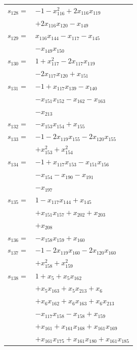 \begin{longtable}{@{}r@{\;}l@{}}
\(s_{128}=\) & \(\displaystyle -1 -x_{116}^{2} +2x_{116}x_{119}\) \\
 & \(\displaystyle +2x_{116}x_{120} -x_{149}\) \\[3pt]
\(s_{129}=\) & \(\displaystyle x_{116}x_{144} -x_{117} -x_{145}\) \\
 & \(\displaystyle -x_{149}x_{150}\) \\[3pt]
\(s_{130}=\) & \(\displaystyle 1 +x_{117}^{2} -2x_{117}x_{119}\) \\
 & \(\displaystyle -2x_{117}x_{120} +x_{151}\) \\[3pt]
\(s_{131}=\) & \(\displaystyle -1 +x_{117}x_{139} -x_{140}\) \\
 & \(\displaystyle -x_{151}x_{152} -x_{162} -x_{163}\) \\
 & \(\displaystyle -x_{213}\) \\[3pt]
\(s_{132}=\) & \(\displaystyle -x_{153}x_{154} +x_{155}\) \\[3pt]
\(s_{133}=\) & \(\displaystyle -1 -2x_{119}x_{155} -2x_{120}x_{155}\) \\
 & \(\displaystyle +x_{153}^{2} +x_{154}^{2}\) \\[3pt]
\(s_{134}=\) & \(\displaystyle -1 +x_{117}x_{153} -x_{151}x_{156}\) \\
 & \(\displaystyle -x_{154} -x_{190} -x_{191}\) \\
 & \(\displaystyle -x_{197}\) \\[3pt]
\(s_{135}=\) & \(\displaystyle 1 -x_{117}x_{144} +x_{145}\) \\
 & \(\displaystyle +x_{151}x_{157} +x_{202} +x_{203}\) \\
 & \(\displaystyle +x_{208}\) \\[3pt]
\(s_{136}=\) & \(\displaystyle -x_{158}x_{159} +x_{160}\) \\[3pt]
\(s_{137}=\) & \(\displaystyle -1 -2x_{119}x_{160} -2x_{120}x_{160}\) \\
 & \(\displaystyle +x_{158}^{2} +x_{159}^{2}\) \\[3pt]
\(s_{138}=\) & \(\displaystyle 1 +x_{5} +x_{5}x_{162}\) \\
 & \(\displaystyle +x_{5}x_{163} +x_{5}x_{213} +x_{6}\) \\
 & \(\displaystyle +x_{6}x_{162} +x_{6}x_{163} +x_{6}x_{213}\) \\
 & \(\displaystyle -x_{117}x_{158} -x_{158} +x_{159}\) \\
 & \(\displaystyle +x_{161} +x_{161}x_{168} +x_{161}x_{169}\) \\
 & \(\displaystyle +x_{161}x_{175} +x_{161}x_{180} +x_{161}x_{185}\) \\

\end{longtable}
